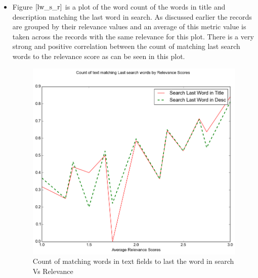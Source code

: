 \documentclass[twoside,12pt]{article}
\begin{document}
\begin{itemize}
\FloatBarrier
\item 
Figure $\eqref{lw_s_r}$ is a plot of the word count of the words in title and description matching the last word in search. As discussed earlier the records are grouped by their relevance values and an average of this metric value is taken across the records with the same relevance for this plot. There is a very strong and positive correlation between the count of matching last search words to the relevance score as can be seen in this plot.
\FloatBarrier
\begin{figure}[!htbp]
	\centering
	\includegraphics[scale=.43]{DataVisualization/lastw_relv_plot.png} 
	\caption{Count of matching words in text fields to last the word in search Vs Relevance}
	\label{lw_s_r}
\end{figure}


\end{itemize}
\end{document}
